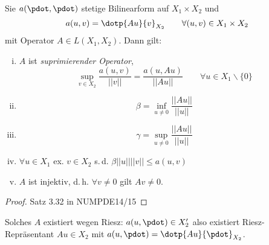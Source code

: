 \begin{satz} \label{4.12}
Sie $a(\pdot,\pdot)$ stetige Bilinearform auf $X_1 \times X_2$ und
\[
	a(u,v) = \dotp{Au}{v}_{X_2} \qquad \forall (u,v) \in X_1 \times X_2
\]
mit Operator $A \in L(X_1,X_2)$. Dann gilt:
\begin{enumerate}[i)]
	\item $A$ ist \emph{suprimierender Operator},
	\[
		\sup\limits_{v \in X_2} \frac{a(u,v)}{||v||} = \frac{a(u,Au)}{||Au||} \qquad \forall u \in X_1 \backslash \{0\}
	\]
	\item \[
		\beta = \inf\limits_{u \neq 0} \frac{||Au||}{||u||}
	\]
	\item \[
		\gamma = \sup\limits_{u \neq 0} \frac{||Au||}{||u||}
	\]
	\item $\forall u \in X_1$ ex. $v \in X_2$ s.\,d. $\beta ||u|| ||v|| \leq a(u,v)$
	\item $A$ ist injektiv, d.\,h. $\forall v \neq 0$ gilt $Av \neq 0$.
\end{enumerate}
\begin{proof}
	Satz 3.32 in NUMPDE14/15
\end{proof}
\end{satz}

\begin{bem}
Solches $A$ existiert wegen Riesz: $a(u,\pdot) \in X'_2$ also existiert Riesz-Repräsentant $Au \in X_2$ mit $a(u,\pdot) = \dotp{Au}{\pdot}_{X_2}$.
\end{bem}

